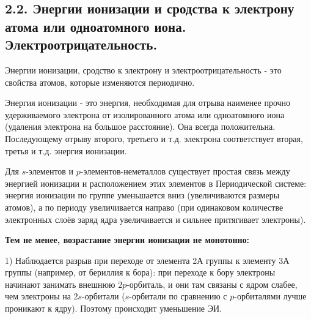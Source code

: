 
\subsection{2.2. Энергии ионизации и сродства к электрону атома или одноатомного иона. Электроотрицательность.} 

\par\bigskip

Энергии ионизации, сродство к электрону и
электроотрицательность - это свойства атомов, которые
изменяются периодично.

\par\smallskip

Энергия ионизации - это энергия, необходимая для отрыва
наименее прочно удерживаемого электрона от изолированного
атома или одноатомного иона (удаления электрона на большое
расстояние). Она всегда положительна.
Последующему отрыву второго, третьего и т.д. электрона
соответствует вторая, третья и т.д. энергия ионизации. 

\par\smallskip

Для $s$-элементов и $p$-элементов-неметаллов существует простая
связь между энергией ионизации и расположением этих элементов
в Периодической системе: энергия ионизации по группе
уменьшается вниз (увеличиваются размеры атомов), а по периоду
увеличивается направо (при одинаковом количестве электронных
слоёв заряд ядра увеличивается и сильнее притягивает электроны).


\begin{center}
	\textbf{Тем не менее, возрастание энергии ионизации не монотонно:}
\end{center}


1) Наблюдается разрыв при переходе от элемента 2А группы к
элементу 3А группы (например, от бериллия к бора): при
переходе к бору электроны начинают занимать внешнюю $2p$-орбиталь, и они там связаны с ядром слабее, чем электроны на
$2s$-орбитали ($s$-орбитали по сравнению с $p$-орбиталями лучше проникают к
ядру). Поэтому происходит уменьшение ЭИ.
	
